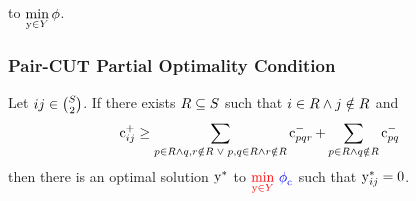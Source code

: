\begin{frame}
{        to $\min\limits_{\operatorname{y} \in Y}\operatorname{\phi}$.\\
    }
    \vspace{5px}
\end{frame}

\begin{frame}
    \frametitle{Pair-CUT Partial Optimality Condition}
    Let $ij \in \binom{S}{2}$.
    If there exists $R \subseteq S$
    such that $i \in R \land j \notin R$ and
    \[
        \operatorname{c}^+_{ij} \geq 
        \sum\limits_{p \in R \land q,r \notin R \;\lor\; p,q \in R \land r \notin R}
        \operatorname{c}^-_{pqr} +
        \sum\limits_{p \in R \land q \notin R}
        \operatorname{c}^-_{pq}
    \]
    then there is an optimal solution $\operatorname{y}^*$
    to $\text{\textcolor{red}{$\min\limits_{\operatorname{y} \in Y}$} \textcolor{blue}{$\operatorname{\phi}_{\operatorname{c}}$}}$
    such that $\operatorname{y}^*_{ij} = 0$.\\
    \vspace{10px}


\end{frame}
